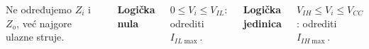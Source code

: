 \begin{frame}[label=08-s027]
\begin{columns}[T,onlytextwidth]
\centering\par\medskip

Ne određujemo $Z_i$ i $Z_o$, već najgore ulazne struje.\par\medskip
\textbf{Logička nula}\par
$0\leq V_i\leq V_{IL}$: odrediti $I_{IL\max}$.\par\medskip
\textbf{Logička jedinica}\par
$V_{IH}\leq V_i\leq V_{CC}$: odrediti $I_{IH\max}$.
\end{columns}
\end{frame}
